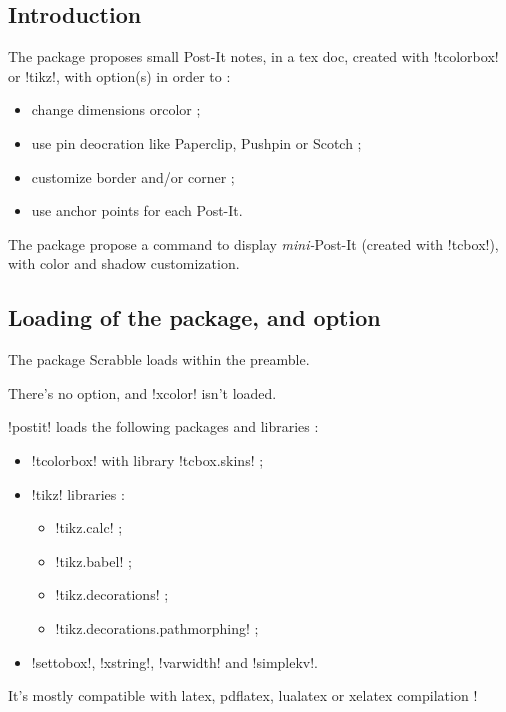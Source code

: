 \documentclass[english,a4paper,11pt]{article}
\begin{document}
\subsection{Introduction}

\begin{noteblock}
The package proposes small Post-It notes, in a \textsf{tex} doc, created with \packagetex!tcolorbox! or \packagetex!tikz!, with option(s) in order to :

\begin{itemize}
	\item change dimensions orcolor ;
	\item use pin deocration like Paperclip, Pushpin or Scotch ;
	\item customize border and/or corner ;
	\item use anchor points for each Post-It.
\end{itemize}

The package propose a command to display \textit{mini-}Post-It (created with \motcletex!tcbox!), with color and shadow customization.
\end{noteblock}

\subsection{Loading of the package, and option}

\begin{importantblock}
The package Scrabble loads within the preamble.

There's no option, and \packagetex!xcolor! isn't loaded.
\end{importantblock}


\begin{noteblock}
\packagetex!postit! loads the following packages and libraries :

\begin{itemize}
	\item \packagetex!tcolorbox! with library \packagetex!tcbox.skins! ;
	\item \packagetex!tikz! libraries :
	\begin{itemize}
		\item \packagetex!tikz.calc! ;
		\item \packagetex!tikz.babel! ;
		\item \packagetex!tikz.decorations! ;
		\item \packagetex!tikz.decorations.pathmorphing! ;
	\end{itemize}
	\item \packagetex!settobox!, \packagetex!xstring!, \packagetex!varwidth! and \packagetex!simplekv!.
\end{itemize}

It’s mostly compatible with \textsf{latex}, \textsf{pdflatex}, \textsf{lualatex} or \textsf{xelatex} compilation !
\end{noteblock}
\end{document}

